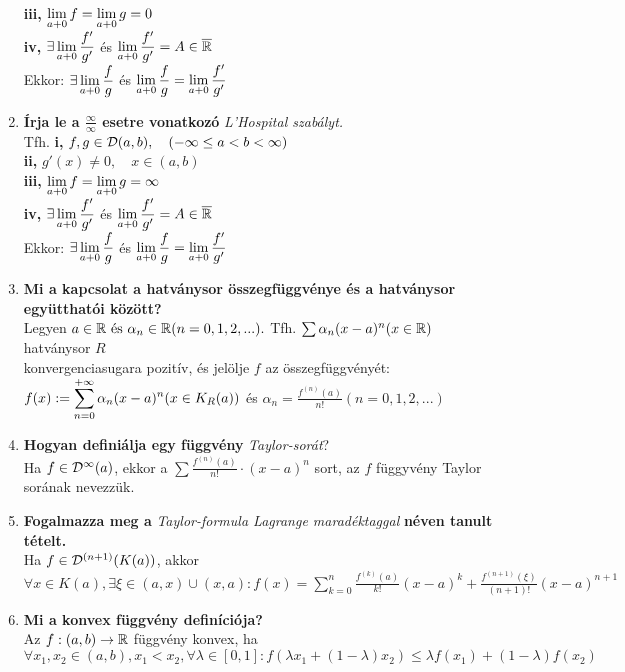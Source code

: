 \documentclass[a4paper,11pt]{article}
\begin{document}
\begin{enumerate}
	\\[0.2cm]\hspace*{0.8cm}\textbf{iii,} $\displaystyle\lim_{a+0} f=\displaystyle\lim_{a+0} g=0$
	\\[0.2cm]\hspace*{0.8cm}\textbf{iv,} $\exists\displaystyle\lim_{a+0} \frac{f'}{g'}$ és $\displaystyle\lim_{a+0}\frac{f'}{g'}=A\in\overline{\mathbb{R}}$\\[0.2cm] Ekkor: $\exists\displaystyle\lim_{a+0}
	\frac{f}{g}$ és $\displaystyle\lim_{a+0}\frac{f}{g}=\displaystyle\lim_{a+0}\frac{f'}{g'}$
	\item \textbf{Írja le a $\frac{\infty}{\infty}$ esetre vonatkozó}
	\textit{L'Hospital szabályt.}\\[0.1cm]
	Tfh. \textbf{i,} $f,g\in\mathcal{D}(a,b),\quad(-\infty\leq a<b<\infty)$\\[0.2cm] 
	\hspace*{0.8cm}\textbf{ii,} $g'(x)\neq0,\quad x\in(a,b)$\\[0.2cm] 
	\hspace*{0.8cm}\textbf{iii,} $\displaystyle\lim_{a+0} f=\displaystyle\lim_{a+0} g=\infty$\\[0.2cm]
	\hspace*{0.8cm}\textbf{iv,} $\exists\displaystyle\lim_{a+0}\frac{f'}{g'}$ és $\displaystyle\lim_{a+0}
	\frac{f'}{g'}=A\in\overline{\mathbb{R}}$\\[0.2cm] Ekkor: $\exists\displaystyle\lim_{a+0}\frac{f}{g}$ és $\displaystyle\lim_{a+0}\frac{f}{g}=\displaystyle\lim_{a+0}\frac{f'}{g'}$
	\item \textbf{Mi a kapcsolat a hatványsor összegfüggvénye és a hatványsor együtthatói között?}\\[0.1cm]
	Legyen $a\in\mathbb{R}\text{ és }\alpha_n\in\mathbb{R}(n=0,1,2,...).$ Tfh. $\sum\alpha_n
	(x-a)^n(x\in\mathbb{R})$ hatványsor $R$\\konvergenciasugara pozitív, és jelölje
	$f$ az összegfüggvényét:\\$f(x):=\displaystyle\sum_{n=0}^{+\infty}\alpha_n(x-a)^n(x\in K_R(a))$ és
	$\alpha_n=\frac{f^{(n)}(a)}{n!}(n=0,1,2,...)$
	\item\textbf{Hogyan definiálja egy függvény} \textit{Taylor-sorát}?\\[0.1cm]
	Ha $f\in\mathcal{D}^{\infty}(a)$, ekkor a $\sum\frac{f^{(n)}(a)}{n!} 
	\cdot(x-a)^{n}$ sort, az $f$ függyvény Taylor sorának nevezzük.
	\item\textbf{Fogalmazza meg a} \textit{Taylor-formula Lagrange maradéktaggal}
	\textbf{néven tanult tételt.}\\[0.1cm]
	Ha $f\in\mathcal{D}^{(n+1)}(K(a))$, akkor\\[0.1cm]$\forall x\in K(a),\exists\xi\in(a,x)
	\cup(x,a):f(x)=\sum\limits_{k=0}^{n}\frac{f^{(k)}(a)}{k!}(x-a)^k+
	\frac{f^{(n+1)}(\xi)}{(n+1)!}(x-a)^{n+1}$
	\item \textbf{Mi a konvex függvény definíciója?}\\[0.1cm]Az $f:(a,b)\to\mathbb{R}$ függvény konvex, ha\\[0.1cm] $\forall x_1,x_2\in(a,b),x_1<x_2,\forall\lambda\in[0,1]: f(\lambda x_1+(1-\lambda)x_2)\leq\lambda f(x_1)+(1-\lambda)f(x_2)$\newpage

\end{enumerate}
\end{document}
